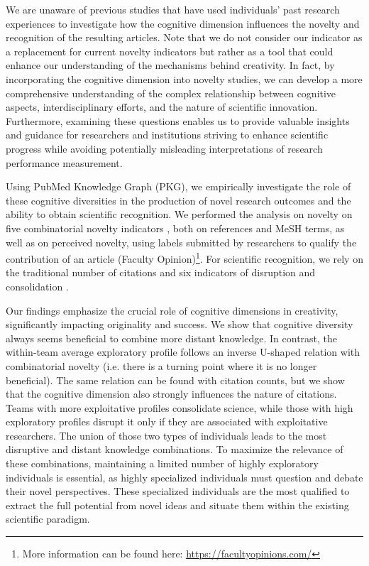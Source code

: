  We are unaware of previous studies that have used individuals' past research experiences to investigate how the cognitive dimension influences the novelty and recognition of the resulting articles. Note that we do not consider our indicator as a replacement for current novelty indicators but rather as a tool that could enhance our understanding of the mechanisms behind creativity. In fact, by incorporating the cognitive dimension into novelty studies, we can develop a more comprehensive understanding of the complex relationship between cognitive aspects, interdisciplinary efforts, and the nature of scientific innovation. Furthermore, examining these questions enables us to provide valuable insights and guidance for researchers and institutions striving to enhance scientific progress while avoiding potentially misleading interpretations of research performance measurement.

Using PubMed Knowledge Graph (PKG), we empirically investigate the role of these cognitive diversities in the production of novel research outcomes and the ability to obtain scientific recognition. We performed the analysis on novelty on five combinatorial novelty indicators \citep{uzzi2013atypical,lee2015creativity,foster2015tradition,wang2017bias,shibayama2021measuring}, both on references and MeSH terms, as well as on perceived novelty, using labels submitted by researchers to qualify the contribution of an article (Faculty Opinion)\footnote{More information can be found here: \href{https://facultyopinions.com/}{https://facultyopinions.com/}}. For scientific recognition, we rely on the traditional number of citations and six indicators of disruption and consolidation \citep{wu2019large,bu2019multi,bornmann1911disruption}.

Our findings emphasize the crucial role of cognitive dimensions in creativity, significantly impacting originality and success. We show that cognitive diversity always seems beneficial to combine more distant knowledge. In contrast, the within-team average exploratory profile follows an inverse U-shaped relation with combinatorial novelty (i.e. there is a turning point where it is no longer beneficial). The same relation can be found with citation counts, but we show that the cognitive dimension also strongly influences the nature of citations. Teams with more exploitative profiles consolidate science, while those with high exploratory profiles disrupt it only if they are associated with exploitative researchers. The union of those two types of individuals leads to the most disruptive and distant knowledge combinations. To maximize the relevance of these combinations, maintaining a limited number of highly exploratory individuals is essential, as highly specialized individuals must question and debate their novel perspectives. These specialized individuals are the most qualified to extract the full potential from novel ideas and situate them within the existing scientific paradigm.

